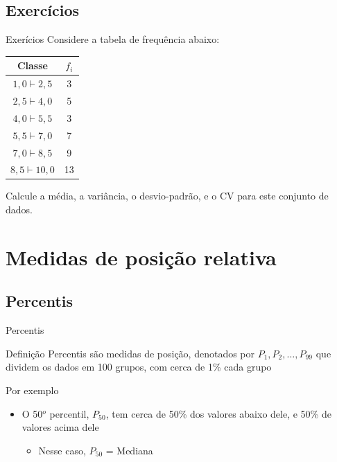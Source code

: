 \documentclass[10pt]{beamer}\usepackage[]{graphicx}\usepackage[]{color}
\theoremstyle{definition}
\begin{document}
\subsection{Exercícios}

\begin{frame}{Exerícios}
  Considere a tabela de frequência abaixo:
  \begin{table}[h]
    \centering
    \begin{tabular}{cc}
      \hline
      Classe & $f_i$ \\
      \hline
      $1,0 \vdash 2,5$ & 3 \\
      $2,5 \vdash 4,0$ & 5 \\
      $4,0 \vdash 5,5$ & 3 \\
      $5,5 \vdash 7,0$ & 7 \\
      $7,0 \vdash 8,5$ & 9 \\
      $8,5 \vdash 10,0$ & 13 \\
      \hline
    \end{tabular}
  \end{table}
  Calcule a média, a variância, o desvio-padrão, e o CV para este
  conjunto de dados.
\end{frame}

\section[Medidas de posição]{Medidas de posição relativa}

\subsection{Percentis}

\begin{frame}{Percentis}
  \begin{block}{Definição}
    Percentis são medidas de posição, denotados por $P_1, P_2,
    \ldots, P_{99}$ que dividem os dados em 100 grupos, com cerca de 1\%
    cada grupo
  \end{block}
  Por exemplo
  \begin{itemize}
  \item O 50$^o$ percentil, $P_{50}$, tem cerca de 50\% dos valores
    abaixo dele, e 50\% de valores acima dele
    \begin{itemize}
    \item Nesse caso, $P_{50}$ = Mediana
    \end{itemize}
  \end{itemize}
\end{frame}
\end{document}
